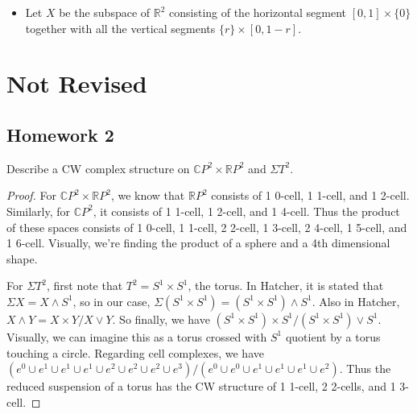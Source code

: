 \documentclass[12pt]{article}
\newenvironment{statement}[2][Statement]{\begin{trivlist}
\item[\hskip \labelsep {\bfseries #1}\hskip \labelsep {\bfseries #2.}]}{\end{trivlist}}
\begin{document}
\begin{statement}[Hatcher] {0.6}
  \begin{itemize}
    \item Let $X$ be the subspace of $\mathbb{R}^2$ consisting of the horizontal segment $[0,1] \times \{0\}$ together with all the vertical segments 
      $\{r\} \times [0,1-r]$. 
  \end{itemize}
\end{statement}

\section{Not Revised}

\subsection{Homework 2}

\begin{statement}[Exercise]{1}
    Describe a CW complex structure on $\mathbb{C}P^2 \times \mathbb{R}P^2$ and $\Sigma T^2$.
\end{statement}
\begin{proof}
    For $\mathbb{C}P^2 \times \mathbb{R}P^2$, we know that $\mathbb{R}P^2$ consists of 1 0-cell, 1 1-cell, and 1 2-cell. Similarly, for $\mathbb{C}P^2$, it consists of 1 1-cell, 1 2-cell, and 1 4-cell. Thus the product of these spaces consists of 1 0-cell, 1 1-cell, 2 2-cell, 1 3-cell, 2 4-cell, 1 5-cell, and 1 6-cell. Visually, we're finding the product of a sphere and a 4th dimensional shape.
    \par For $\Sigma T^2$, first note that $T^2 = S^1 \times S^1$, the torus. In Hatcher, it is stated that $\Sigma X = X \wedge S^1$, so in our case, $\Sigma (S^1 \times S^1) = (S^1 \times S^1) \wedge S^1$. Also in Hatcher, $ X \wedge Y = X \times Y / X \vee Y$. So finally, we have $ (S^1 \times S^1) \times S^1 / (S^1 \times S^1) \vee S^1$. Visually, we can imagine this as a torus crossed with $S^1$ quotient by a torus touching a circle. Regarding cell complexes, we have $(e^0 \cup e^1 \cup e^1 \cup e^1 \cup e^2 \cup e^2 \cup e^2 \cup e^3) / (e^0 \cup e^0 \cup e^1 \cup e^1 \cup e^1 \cup e^2)$. Thus the reduced suspension of a torus has the CW structure of 1 1-cell, 2 2-cells, and 1 3-cell.
\end{proof}
\end{document}
